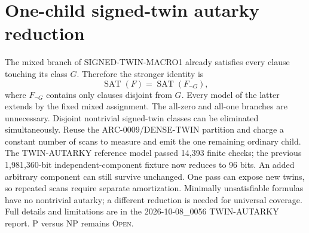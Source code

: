 \section{One-child signed-twin autarky reduction}
The mixed branch of SIGNED-TWIN-MACRO1 already satisfies every clause
touching its class $G$. Therefore the stronger identity is
\[
 \operatorname{SAT}(F)=\operatorname{SAT}(F_{\neg G}),
\]
where $F_{\neg G}$ contains only clauses disjoint from $G$.
Every model of the latter extends by the fixed mixed assignment.
The all-zero and all-one branches are unnecessary. Disjoint nontrivial
signed-twin classes can be eliminated simultaneously. Reuse the
ARC-0009/DENSE-TWIN partition and charge a constant number of scans to
measure and emit the one remaining ordinary child.
The TWIN-AUTARKY reference model passed 14,393 finite checks; the previous
1,981,360-bit independent-component fixture now reduces to 96 bits.
An added arbitrary component can still survive unchanged. One pass can
expose new twins, so repeated scans require separate amortization.
Minimally unsatisfiable formulas have no nontrivial autarky; a different
reduction is needed for universal coverage. Full details and limitations
are in the 2026-10-08\_0056 TWIN-AUTARKY report.
P versus NP remains \textsc{Open}.
